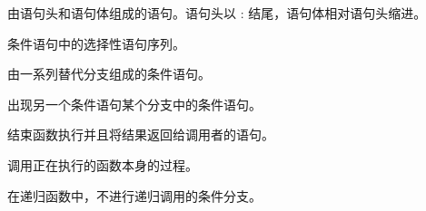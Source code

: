 {{{{\begin{description}
{%

\item[复合语句:] 由语句头和语句体组成的语句。语句头以 : 结尾，语句体相对语句头缩进。


\item[分支:] 条件语句中的选择性语句序列。


\item[链式条件:] 由一系列替代分支组成的条件语句。
  


\item[嵌套条件:] 出现另一个条件语句某个分支中的条件语句。
  


\item[返回语句：] 结束函数执行并且将结果返回给调用者的语句。


\item[递归:] 调用正在执行的函数本身的过程。


\item[基本情形:] 在递归函数中，不进行递归调用的条件分支。

}
\end{description}}}}}
